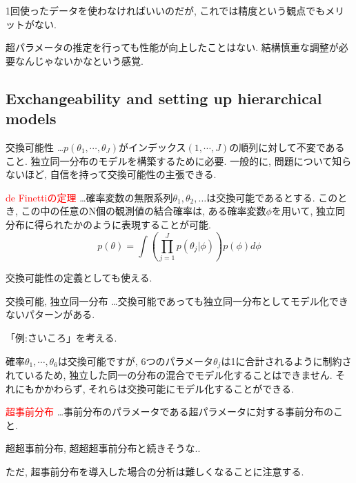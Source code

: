 \documentclass[11pt,a4pape,dvipdfmx]{jarticle}
\newcommand{\tcr}[1]{\textcolor{red}{#1}}
\begin{document}
1回使ったデータを使わなければいいのだが, これでは精度という観点でもメリットがない.

超パラメータの推定を行っても性能が向上したことはない.
結構慎重な調整が必要なんじゃないかなという感覚.



\subsection{Exchangeability and setting up hierarchical models}
\begin{itembox}[l]{交換可能性}
…$p(\theta_1,\cdots,\theta_J)$がインデックス$(1,\cdots,J)$の順列に対して不変であること.
独立同一分布のモデルを構築するために必要.
一般的に, 問題について知らないほど, 自信を持って交換可能性の主張できる.
\end{itembox}



\begin{itembox}[l]{\tcr{de Finettiの定理}}
…確率変数の無限系列$\theta_1,\theta_2,\dots$は交換可能であるとする.
このとき, この中の任意のN個の観測値の結合確率は, ある確率変数$\phi$を用いて, 独立同分布に得られたかのように表現することが可能.
\[p(\theta)=\int \left(\prod_{j=1}^Jp(\theta_j|\phi)\right)p(\phi)d\phi\]
\end{itembox}

交換可能性の定義としても使える.


\begin{itembox}[l]{交換可能, 独立同一分布}
…交換可能であっても独立同一分布としてモデル化できないパターンがある.
\end{itembox}

「例:さいころ」を考える.

確率$\theta_1,\cdots,\theta_6$は交換可能ですが, 6つのパラメータ$\theta_j$は1に合計されるように制約されているため, 独立した同一の分布の混合でモデル化することはできません.
それにもかかわらず, それらは交換可能にモデル化することができる.


\begin{itembox}[l]{\tcr{超事前分布}}
…事前分布のパラメータである超パラメータに対する事前分布のこと.
\end{itembox}

超超事前分布, 超超超事前分布と続きそうな..

ただ, 超事前分布を導入した場合の分析は難しくなることに注意する.

\end{document}
